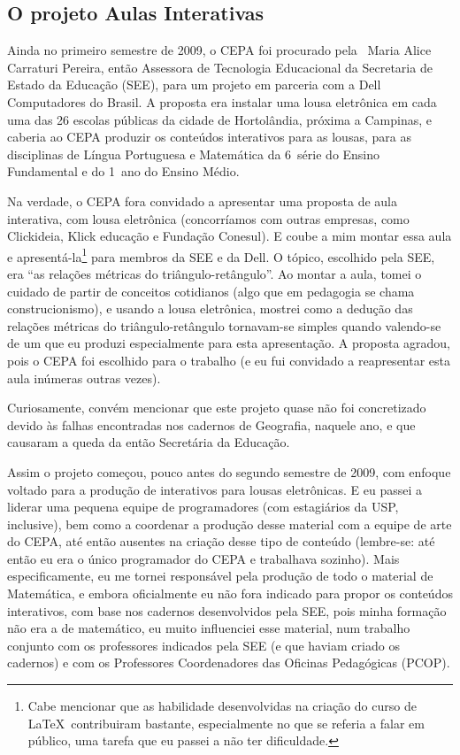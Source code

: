 \subsection{O projeto Aulas Interativas}
\label{sec:aulas-interativas}

Ainda no primeiro semestre de 2009, o CEPA foi procurado pela \profa\ Maria Alice Carraturi Pereira, então Assessora de Tecnologia Educacional da Secretaria de Estado da Educação (SEE), para um projeto em parceria com a Dell Computadores do Brasil. A proposta era instalar uma lousa eletrônica em cada uma das 26 escolas públicas da cidade de Hortolândia, próxima a Campinas, e caberia ao CEPA produzir os conteúdos interativos para as lousas, para as disciplinas de Língua Portuguesa e Matemática da 6\textordfeminine\ série do Ensino Fundamental e do 1\textordmasculine\ ano do Ensino Médio.

Na verdade, o CEPA fora convidado a apresentar uma proposta de aula interativa, com lousa eletrônica (concorríamos com outras empresas, como Clickideia, Klick educação e Fundação Conesul). E coube a mim montar essa aula e apresentá-la\footnote{Cabe mencionar que as habilidade desenvolvidas na criação do curso de \LaTeX\ contribuiram bastante, especialmente no que se referia a falar em público, uma tarefa que eu passei a não ter dificuldade.} para membros da SEE e da Dell. O tópico, escolhido pela SEE, era ``as relações métricas do triângulo-retângulo''. Ao montar a aula, tomei o cuidado de partir de conceitos cotidianos (algo que em pedagogia se chama construcionismo), e usando a lousa eletrônica, mostrei como a dedução das relações métricas do triângulo-retângulo tornavam-se simples quando valendo-se de um  que eu produzi especialmente para esta apresentação. A proposta agradou, pois o CEPA foi escolhido para o trabalho (e eu fui convidado a reapresentar esta aula inúmeras outras vezes).

Curiosamente, convém mencionar que este projeto quase não foi concretizado devido às falhas encontradas nos cadernos de Geografia, naquele ano, e que causaram a queda da então Secretária da Educação.

Assim o projeto começou, pouco antes do segundo semestre de 2009, com enfoque voltado para a produção de  interativos para lousas eletrônicas. E eu passei a liderar uma pequena equipe de programadores (com estagiários da USP, inclusive), bem como a coordenar a produção desse material com a equipe de arte do CEPA, até então ausentes na criação desse tipo de conteúdo (lembre-se: até então eu era o único programador do CEPA e trabalhava sozinho). Mais especificamente, eu me tornei responsável pela produção de todo o material de Matemática, e embora oficialmente eu não fora indicado para propor os conteúdos interativos, com base nos cadernos desenvolvidos pela SEE, pois minha formação não era a de matemático, eu muito influenciei esse material, num trabalho conjunto com os professores indicados pela SEE (e que haviam criado os cadernos) e com os Professores Coordenadores das Oficinas Pedagógicas (PCOP).

